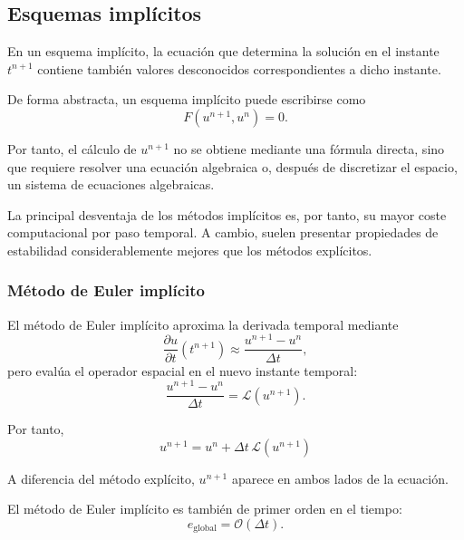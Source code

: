 \documentclass[12pt]{article}
\begin{document}
\subsection*{Esquemas implícitos}

En un esquema implícito, la ecuación que determina la solución en el instante $t^{n+1}$ contiene también valores desconocidos correspondientes a dicho instante.

De forma abstracta, un esquema implícito puede escribirse como
\begin{equation}
    F(u^{n+1},u^n)=0.
\end{equation}

Por tanto, el cálculo de $u^{n+1}$ no se obtiene mediante una fórmula directa, sino que requiere resolver una ecuación algebraica o, después de discretizar el espacio, un sistema de ecuaciones algebraicas.

La principal desventaja de los métodos implícitos es, por tanto, su mayor coste computacional por paso temporal. A cambio, suelen presentar propiedades de estabilidad considerablemente mejores que los métodos explícitos.

\subsubsection*{Método de Euler implícito}

El método de Euler implícito aproxima la derivada temporal mediante
\begin{equation}
    \frac{\partial u}{\partial t}(t^{n+1})
    \approx
    \frac{u^{n+1}-u^n}{\Delta t},
\end{equation}
pero evalúa el operador espacial en el nuevo instante temporal:
\begin{equation}
    \frac{u^{n+1}-u^n}{\Delta t}
    =
    \mathcal{L}(u^{n+1}).
\end{equation}

Por tanto,
\begin{equation}
    \boxed{
    u^{n+1}
    =
    u^n
    +
    \Delta t\,
    \mathcal{L}(u^{n+1})
    }
\end{equation}

A diferencia del método explícito, $u^{n+1}$ aparece en ambos lados de la ecuación.

El método de Euler implícito es también de primer orden en el tiempo:
\begin{equation}
    e_{\mathrm{global}}
    =
    \mathcal{O}(\Delta t).
\end{equation}
\end{document}
